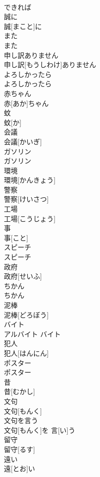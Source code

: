 \documentclass[8pt]{extreport}
\begin{document}
\begin{CJK}{UTF8}{min}
\\	できれば
\\	誠に	
\\	誠[まこと]に
\\	また	
\\	また
\\	申し訳ありません	
\\	申し訳[もうしわけ]ありません
\\	よろしかったら	
\\	よろしかったら
\\	赤ちゃん	
\\	赤[あか]ちゃん
\\	蚊	
\\	蚊[か]
\\	会議	
\\	会議[かいぎ]
\\	ガソリン	
\\	ガソリン
\\	環境	
\\	環境[かんきょう]
\\	警察	
\\	警察[けいさつ]
\\	工場	
\\	工場[こうじょう]
\\	事	
\\	事[こと]
\\	スピーチ	
\\	スピーチ
\\	政府	
\\	政府[せいふ]
\\	ちかん	
\\	ちかん
\\	泥棒	
\\	泥棒[どろぼう]
\\	バイト	
\\	アルバイト	バイト
\\	犯人	
\\	犯人[はんにん]
\\	ポスター	
\\	ポスター
\\	昔	
\\	昔[むかし]
\\	文句	
\\	文句[もんく]
\\	文句を言う	
\\	文句[もんく]を 言[い]う
\\	留守	
\\	留守[るす]
\\	遠い	
\\	遠[とお]い

\end{CJK}
\end{document}
